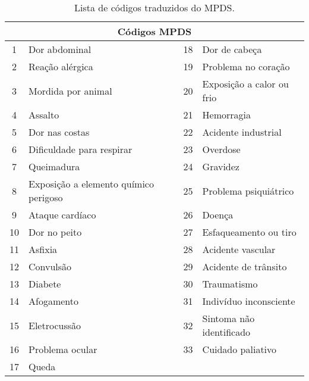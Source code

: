 \begin{table}[ht!]
\caption{Lista de códigos traduzidos do MPDS.}
\label{tab:mpdsCodes}
\centering
\begin{tabular}{@{}clcl@{}}
\toprule
\multicolumn{4}{c}{\textbf{Códigos MPDS}}                                        \\ \midrule
1  & Dor abdominal                         & 18 & Dor de cabeça             \\ \midrule
2  & Reação alérgica                       & 19 & Problema no coração       \\ \midrule
3  & Mordida por animal                    & 20 & Exposição a calor ou frio \\ \midrule
4  & Assalto                               & 21 & Hemorragia                \\ \midrule
5  & Dor nas costas                        & 22 & Acidente industrial       \\ \midrule
6  & Dificuldade para respirar             & 23 & Overdose                  \\ \midrule
7  & Queimadura                            & 24 & Gravidez                  \\ \midrule
8  & Exposição a elemento químico perigoso & 25 & Problema psiquiátrico     \\ \midrule
9  & Ataque cardíaco                       & 26 & Doença                    \\ \midrule
10 & Dor no peito                          & 27 & Esfaqueamento ou tiro     \\ \midrule
11 & Asfixia                               & 28 & Acidente vascular         \\ \midrule
12 & Convulsão                             & 29 & Acidente de trânsito      \\ \midrule
13 & Diabete                               & 30 & Traumatismo               \\ \midrule
14 & Afogamento                            & 31 & Indivíduo inconsciente    \\ \midrule
15 & Eletrocussão                          & 32 & Sintoma não identificado  \\ \midrule
16 & Problema ocular                       & 33 & Cuidado paliativo         \\ \midrule
17 & Queda                                 &    &                           \\ \bottomrule
\end{tabular}%
\end{table}

